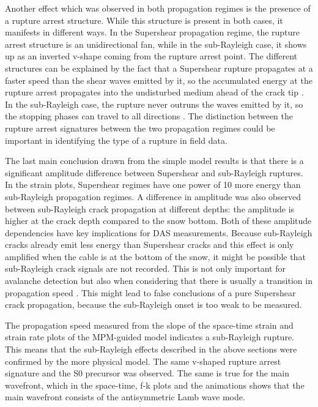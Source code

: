 Another effect which was observed in both propagation regimes is the presence of a rupture arrest structure. While this structure is present in both cases, it manifests in different ways. In the Supershear propagation regime, the rupture arrest structure is an unidirectional fan, while in the sub-Rayleigh case, it shows up as an inverted v-shape coming from the rupture arrest point. The different structures can be explained by the fact that a Supershear rupture propagates at a faster speed than the shear waves emitted by it, so the accumulated energy at the rupture arrest propagates into the undisturbed medium ahead of the crack tip \parencite{madariagaHighfrequencyRadiationCrack1977}. In the sub-Rayleigh case, the rupture never outruns the waves emitted by it, so the stopping phases can travel to all directions \parencite{freundDynamicFractureMechanics1998}. The distinction between the rupture arrest signatures between the two propagation regimes could be important in identifying the type of a rupture in field data. \par 

The last main conclusion drawn from the simple model results is that there is a significant amplitude difference between Supershear and sub-Rayleigh ruptures. In the strain plots, Supershear regimes have one power of 10 more energy than sub-Rayleigh propagation regimes. A difference in amplitude was also observed between sub-Rayleigh crack propagation at different depths: the amplitude is higher at the crack depth compared to the snow bottom. Both of these amplitude dependencies have key implications for DAS measurements. Because sub-Rayleigh cracks already emit less energy than Supershear cracks and this effect is only amplified when the cable is at the bottom of the snow, it might be possible that sub-Rayleigh crack signals are not recorded. This is not only important for avalanche detection but also when considering that there is usually a transition in propagation speed \parencite{sironTheoreticalFrameworkDynamic2023,bobillierNumericalInvestigationCrack2024}. This might lead to false conclusions of a pure Supershear crack propagation, because the sub-Rayleigh onset is too weak to be measured. \par 



The propagation speed measured from the slope of the space-time strain and strain rate plots of the MPM-guided model indicates a sub-Rayleigh rupture. This means that the sub-Rayleigh effects described in the above sections were confirmed by the more physical model. The same v-shaped rupture arrest signature and the S0 precursor was observed. The same is true for the main wavefront, which in the space-time, f-k plots and the animations shows that the main wavefront consists of the antisymmetric Lamb wave mode. \par 

